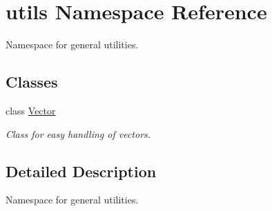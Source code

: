 \hypertarget{namespaceutils}{\section{utils Namespace Reference}
\label{namespaceutils}
}


Namespace for general utilities.  


\subsection*{Classes}
\begin{DoxyCompactItemize}
\item 
class \hyperlink{classutils_1_1Vector}{Vector}
\begin{DoxyCompactList}\small\item\em Class for easy handling of vectors. \end{DoxyCompactList}\end{DoxyCompactItemize}


\subsection{Detailed Description}
Namespace for general utilities. 